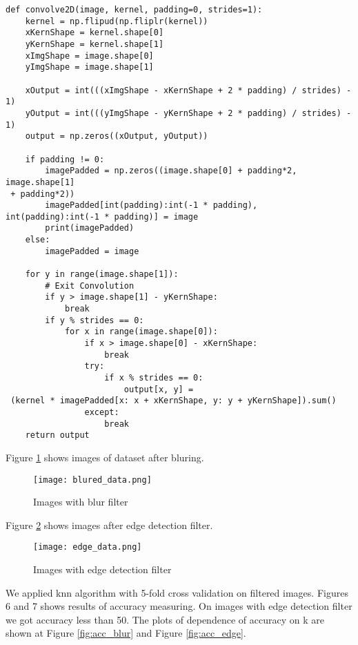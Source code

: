 \documentclass[a4paper, twoside, english]{article}
\begin{document}
\begin{lstlisting}[language=iPython]
def convolve2D(image, kernel, padding=0, strides=1):
    kernel = np.flipud(np.fliplr(kernel))
    xKernShape = kernel.shape[0]
    yKernShape = kernel.shape[1]
    xImgShape = image.shape[0]
    yImgShape = image.shape[1]

    xOutput = int(((xImgShape - xKernShape + 2 * padding) / strides) - 1)
    yOutput = int(((yImgShape - yKernShape + 2 * padding) / strides) - 1)
    output = np.zeros((xOutput, yOutput))

    if padding != 0:
        imagePadded = np.zeros((image.shape[0] + padding*2, image.shape[1]
 + padding*2))
        imagePadded[int(padding):int(-1 * padding), int(padding):int(-1 * padding)] = image
        print(imagePadded)
    else:
        imagePadded = image

    for y in range(image.shape[1]):
        # Exit Convolution
        if y > image.shape[1] - yKernShape:
            break
        if y % strides == 0:
            for x in range(image.shape[0]):
                if x > image.shape[0] - xKernShape:
                    break
                try:
                    if x % strides == 0:
                        output[x, y] =
 (kernel * imagePadded[x: x + xKernShape, y: y + yKernShape]).sum()
                except:
                    break
    return output
\end{lstlisting}

\newpage
Figure \ref{fig:blur} shows images of dataset after bluring.

\begin{figure}[h!]
	\centerline{\texttt{[image: blured\_data.png]}}
	\caption[classes]{Images with blur filter}
	\label{fig:blur}
\end{figure}


Figure \ref{fig:edge} shows images after edge detection filter.


\begin{figure}[h!]
	\centerline{\texttt{[image: edge\_data.png]}}
	\caption[classes]{Images with edge detection filter}
	\label{fig:edge}
\end{figure}
\newpage

We applied knn algorithm with 5-fold cross validation on filtered images. Figures 6 and 7 shows results of accuracy measuring.  On images with edge detection filter we got accuracy less than 50. The plots of dependence of accuracy on k are shown at Figure \ref{fig:acc_blur} and Figure \ref{fig:acc_edge}.\\
\end{document}
